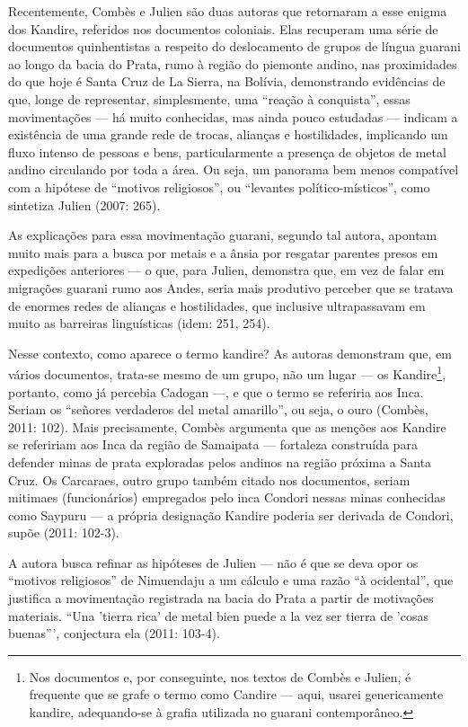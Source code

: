Recentemente, Combès e Julien são duas autoras que retornaram a esse
enigma dos Kandire, referidos nos documentos coloniais. Elas recuperam
uma série de documentos quinhentistas a respeito do deslocamento de
grupos de língua guarani ao longo da bacia do Prata, rumo à região do
piemonte andino, nas proximidades do que hoje é Santa Cruz de La
Sierra, na Bolívia, demonstrando evidências de que, longe de
representar, simplesmente, uma ``reação à conquista'', essas
movimentações — há muito conhecidas, mas ainda pouco estudadas —
indicam a existência de uma grande rede de trocas, alianças e
hostilidades, implicando um fluxo intenso de pessoas e bens,
particularmente a presença de objetos de metal andino circulando por
toda a área. Ou seja, um panorama bem menos compatível com a hipótese
de ``motivos religiosos'', ou ``levantes político-místicos'', como
sintetiza Julien (2007: 265).

As explicações para essa movimentação guarani, segundo tal autora,
apontam muito mais para a busca por metais e a ânsia por resgatar
parentes presos em expedições anteriores — o que, para Julien,
demonstra que, em vez de falar em migrações guarani rumo aos Andes,
seria mais produtivo perceber que se tratava de enormes redes de
alianças e hostilidades, que inclusive ultrapassavam em muito as
barreiras linguísticas (idem: 251, 254).

Nesse contexto, como aparece o termo kandire? As autoras demonstram que,
em vários documentos, trata-se mesmo de um grupo, não um lugar — os
Kandire\footnote{Nos documentos e, por conseguinte, nos textos de
Combès e Julien, é frequente que se grafe o termo como Candire — aqui,
usarei genericamente kandire, adequando-se à grafia utilizada no
guarani contemporâneo.}, portanto, como já percebia Cadogan —, e que o
termo se referiria aos Inca. Seriam os ``señores verdaderos del metal
amarillo'', ou seja, o ouro (Combès, 2011: 102). Mais precisamente,
Combès argumenta que as menções aos Kandire se refeririam aos Inca da
região de Samaipata — fortaleza construída para defender minas de prata
exploradas pelos andinos na região próxima a Santa Cruz. Os Carcaraes,
outro grupo também citado nos documentos, seriam mitimaes
(funcionários) empregados pelo inca Condori nessas minas conhecidas
como Saypuru — a própria designação Kandire poderia ser derivada de
Condori, supõe (2011: 102-3).

A autora busca refinar as hipóteses de Julien — não é que se deva opor
os ``motivos religiosos'' de Nimuendaju a um cálculo e uma razão ``à
ocidental'', que justifica a movimentação registrada na bacia do Prata a
partir de motivações materiais. ``Una 'tierra
rica' de metal bien puede a la vez ser tierra de
'cosas buenas''', conjectura ela
(2011: 103-4).

